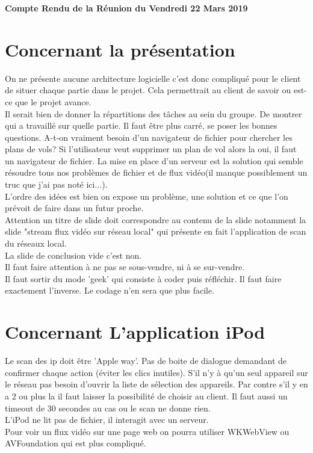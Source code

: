 \documentclass[]{article}
\begin{document}
\pagestyle{fancy}
\renewcommand\headrulewidth{1pt}
\renewcommand\footrulewidth{1pt}

\begin{center}
\large{\textbf{Compte Rendu de la Réunion du Vendredi 22 Mars 2019 \bigbreak}}
\end{center}

\section{Concernant la présentation}
\indent On ne présente aucune architecture logicielle c'est donc compliqué pour le client de situer chaque partie dans le projet. Cela permettrait au client de savoir ou est-ce que le projet avance.\\
Il serait bien de donner la répartitions des tâches au sein du groupe. De montrer qui a travaillé sur quelle partie. Il faut être plus carré, se poser les bonnes questions. A-t-on vraiment besoin d'un navigateur de fichier pour chercher les plans de vols? Si l'utilisateur veut supprimer un plan de vol alors la oui, il faut un navigateur de fichier. La mise en place d'un serveur est la solution qui semble résoudre tous nos problèmes de fichier et de flux vidéo(il manque possiblement un truc que j'ai pas noté ici...).\\
L'ordre des idées est bien on  expose un problème, une solution et ce que l'on prévoit de faire dans un futur proche.\\
Attention un titre de slide doit correspondre au contenu de la slide notamment la slide "stream flux vidéo sur réseau local" qui présente en fait l'application de scan du réseaux local. \\
La slide de conclusion vide c'est non.\\
Il faut faire attention à ne pas se sous-vendre, ni à se sur-vendre.\\
Il faut sortir du mode 'geek' qui consiste à coder puis réfléchir. Il faut faire exactement l'inverse. Le codage n'en sera que plus facile.\\



\section{Concernant L'application iPod}
Le scan des ip doit être 'Apple way'. Pas de boite de dialogue demandant de confirmer chaque action (éviter les clics inutiles). S'il n'y à qu'un seul appareil sur le réseau pas besoin d'ouvrir la liste de sélection des appareils. Par contre s'il y en a 2 ou plus la il faut laisser la possibilité de choisir au client. Il faut aussi un timeout de 30 secondes au cas ou le scan ne donne rien.\\
L'iPod ne lit pas de fichier, il interagit avec un serveur.\\
Pour voir un flux vidéo sur une page web on pourra utiliser WKWebView ou AVFoundation qui est plus compliqué.\\
\end{document}
